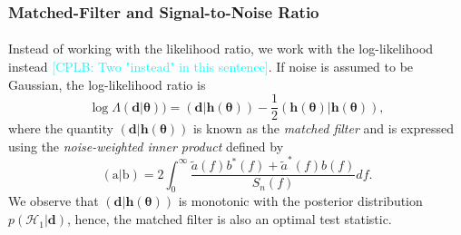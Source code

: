 \documentclass[a4paper,12pt]{article}
\newcommand{\cplb}[1]{\textcolor{cyan}{[CPLB: #1]}}
\begin{document}
\subsubsection{Matched-Filter and Signal-to-Noise Ratio}
\label{MatchFiltSNR}

\paragraph{}
Instead of working with the likelihood ratio, we work with the log-likelihood instead \cplb{Two "instead" in this sentence}. 
If noise is assumed to be Gaussian, the log-likelihood ratio is
\begin{equation}    
\log\Lambda(\mathbf{d}|\boldsymbol{\theta})) = (\mathbf{d}|\mathbf{h}(\boldsymbol{\theta}))-\frac{1}{2}(\mathbf{h}(\boldsymbol{\theta})|\mathbf{h}(\boldsymbol{\theta})),
\label{eq:loglikelihoodratio}
\end{equation}
where the quantity $(\mathbf{d}|\mathbf{h}(\boldsymbol{\theta}))$ is known as the \textit{matched filter} \cite{abbott2020guide} and is expressed using the \textit{noise-weighted inner product} defined by
\begin{equation}    
(\boldsymbol{\mathrm{a}}|\boldsymbol{\mathrm{b}})= 2\int^{\infty}_{0}\frac{\tilde{a}(f)b^{*}(f)+\tilde{a}^{*}(f)b(f)}{S_{n}(f)}df.
\label{eq:innerproduct}
\end{equation}
We observe that $(\mathbf{d}|\mathbf{h}(\boldsymbol{\theta}))$ is monotonic with the posterior distribution $p(\mathcal{H}_{1}|\mathbf{d})$, hence, the matched filter is also an optimal test statistic.
\end{document}
